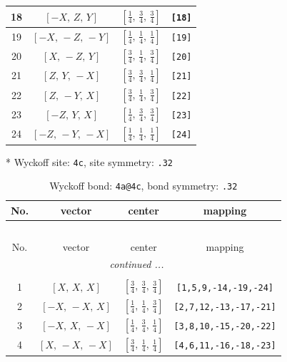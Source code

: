 \documentclass[fleqn,8pt]{jsarticle}
\begin{document}
\begin{longtable}{cccc}
18 & $\left[ - X,\, Z,\, Y \right]$ & $\left[ \frac{1}{4},\, \frac{3}{4},\, \frac{3}{4} \right]$ & {\tt [18]} \\ \hline
19 & $\left[ - X,\, - Z,\, - Y \right]$ & $\left[ \frac{1}{4},\, \frac{1}{4},\, \frac{1}{4} \right]$ & {\tt [19]} \\ \hline
20 & $\left[ X,\, - Z,\, Y \right]$ & $\left[ \frac{3}{4},\, \frac{1}{4},\, \frac{3}{4} \right]$ & {\tt [20]} \\ \hline
21 & $\left[ Z,\, Y,\, - X \right]$ & $\left[ \frac{3}{4},\, \frac{3}{4},\, \frac{1}{4} \right]$ & {\tt [21]} \\ \hline
22 & $\left[ Z,\, - Y,\, X \right]$ & $\left[ \frac{3}{4},\, \frac{1}{4},\, \frac{3}{4} \right]$ & {\tt [22]} \\ \hline
23 & $\left[ - Z,\, Y,\, X \right]$ & $\left[ \frac{1}{4},\, \frac{3}{4},\, \frac{3}{4} \right]$ & {\tt [23]} \\ \hline
24 & $\left[ - Z,\, - Y,\, - X \right]$ & $\left[ \frac{1}{4},\, \frac{1}{4},\, \frac{1}{4} \right]$ & {\tt [24]} \\
\end{longtable}
* Wyckoff site: {\tt 4c}, site symmetry: {\tt .32}
\renewcommand{\arraystretch}{1.2}
\begin{longtable}{cccc}
\caption{Wyckoff bond: {\tt 4a@4c}, bond symmetry: {\tt .32}}
 \\
 \hline \hline
No. & vector & center & mapping \\ \hline \endfirsthead

\multicolumn{3}{l}{\tablename\ \thetable{}} \\
 \hline \hline
No. & vector & center & mapping \\ \hline \endhead

 \hline \hline
\multicolumn{3}{r}{\footnotesize\it continued ...} \\ \endfoot

 \hline \hline
\multicolumn{3}{r}{} \\ \endlastfoot

1 & $\left[ X,\, X,\, X \right]$ & $\left[ \frac{3}{4},\, \frac{3}{4},\, \frac{3}{4} \right]$ & {\tt [1,5,9,-14,-19,-24]} \\ \hline
2 & $\left[ - X,\, - X,\, X \right]$ & $\left[ \frac{1}{4},\, \frac{1}{4},\, \frac{3}{4} \right]$ & {\tt [2,7,12,-13,-17,-21]} \\ \hline
3 & $\left[ - X,\, X,\, - X \right]$ & $\left[ \frac{1}{4},\, \frac{3}{4},\, \frac{1}{4} \right]$ & {\tt [3,8,10,-15,-20,-22]} \\ \hline
4 & $\left[ X,\, - X,\, - X \right]$ & $\left[ \frac{3}{4},\, \frac{1}{4},\, \frac{1}{4} \right]$ & {\tt [4,6,11,-16,-18,-23]} \\
\end{longtable}
\end{document}
